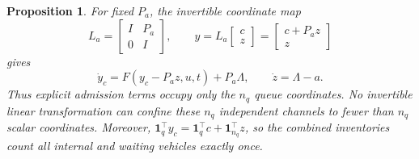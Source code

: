 \documentclass[preprint,12pt]{elsarticle}
\newtheorem{proposition}{Proposition}
\begin{document}
\begin{proposition}
\label{prop:network-localization}
For fixed $P_a$, the invertible coordinate map
\begin{equation}
 L_a=\begin{bmatrix}I&P_a\\0&I\end{bmatrix},\qquad
 y=L_a\begin{bmatrix}c\\z\end{bmatrix}
   =\begin{bmatrix}c+P_a z\\z\end{bmatrix}
 \label{eq:network-transform}
\end{equation}
gives
\begin{equation}
 \dot y_c=F(y_c-P_a z,u,t)+P_a\Lambda,\qquad
 \dot z=\Lambda-a.
 \label{eq:network-transformed-flow}
\end{equation}
Thus explicit admission terms occupy only the $n_q$ queue coordinates. No
invertible linear transformation can confine these $n_q$ independent channels
to fewer than $n_q$ scalar coordinates. Moreover,
$\mathbf1_q^\top y_c=\mathbf1_q^\top c+\mathbf1_{n_q}^\top z$, so the combined
inventories count all internal and waiting vehicles exactly once.
\end{proposition}
\end{document}
